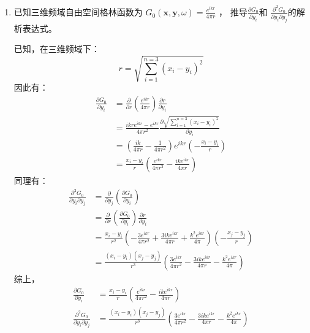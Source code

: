 \begin{enumerate}
    \item 已知三维频域自由空间格林函数为
        $ G_{0} \left( \mathbf{x},\mathbf{y},\omega \right) = \frac{e^{i k r}}{4 \pi r} $ ，
        推导$ \frac{ \partial G_{0} }{ \partial y_{i} } $和
        $ \frac{ \partial^{2} G_{0} }{ \partial y_{i} \partial y_{j} } $的解析表达式。

        已知，在三维频域下：
        \begin{equation}
            r = \sqrt{ \sum^{n = 3}_{i = 1} \left( x_{i} - y_{i} \right)^{2}}
        \end{equation}
        因此有：
        \begin{equation}
            \begin{aligned}
                \frac{ \partial G_{0} }{ \partial y_{i} }
                &= \frac{ \partial }{ \partial r } \left(  \frac{e^{i k r}}{4 \pi r} \right) \frac{ \partial r }{ \partial y_{i} }\\
                &= \frac{i k r e^{ikr} - e^{ikr} }{4 \pi r^{2}} \frac{\partial \sqrt{ \sum^{n = 3}_{i = 1} \left( x_{i} - y_{i} \right)^{2}} }{\partial y_{i}} \\
                &= \left(\frac{i k}{4 \pi r} - \frac{1}{4 \pi r^{2}}\right) e^{ikr} \left(- \frac{x_{i} - y_{i}}{r}\right)\\
                &= \frac{x_{i} - y_{i}}{r} \left(\frac{e^{ikr}}{4 \pi r^{2}}-\frac{i k e^{ikr}}{4 \pi r}\right)
            \end{aligned}
        \end{equation}
        同理有：
        \begin{equation}
            \begin{aligned}
                \frac{ \partial^{2} G_{0} }{ \partial y_{i} \partial y_{j} }
                &= \frac{ \partial }{ \partial y_{j} } \left(\frac{ \partial G_{0} }{ \partial y_{i} } \right) \\
                &= \frac{ \partial }{ \partial r } \left(\frac{ \partial G_{0} }{ \partial y_{i} } \right) \frac{ \partial r }{ \partial y_{i} } \\
                &= \frac{x_{i}-y_{i}}{r^2} \left( - \frac{3 e^{ikr}}{4 \pi r^2} + \frac{3 i k e^{ikr}}{4 \pi r} + \frac{k^{2} e^{ikr}}{4 \pi }\right) \left(-\frac{x_{j}-y_{j}}{r}\right) \\
                &= \frac{(x_{i}-y_{i})(x_{j}-y_{j})}{r^3} \left(\frac{3 e^{ikr}}{4 \pi r^2} - \frac{3 i k e^{ikr}}{4 \pi  r} - \frac{k^{2} e^{ikr}}{4 \pi }\right)
            \end{aligned}
        \end{equation}
        综上，
        \begin{align}
            \frac{ \partial G_{0} }{ \partial y_{i} } 
            &= \frac{x_{i} - y_{i}}{r} \left(\frac{e^{ikr}}{4 \pi r^{2}}-\frac{i k e^{ikr}}{4 \pi r}\right) \\
            \frac{ \partial^{2} G_{0} }{ \partial y_{i} \partial y_{j} }
            &= \frac{(x_{i}-y_{i})(x_{j}-y_{j})}{r^3} \left(\frac{3 e^{ikr}}{4 \pi r^2} - \frac{3 i k e^{ikr}}{4 \pi r} - \frac{k^{2} e^{ikr}}{4 \pi }\right)
        \end{align}
    

\end{enumerate}
